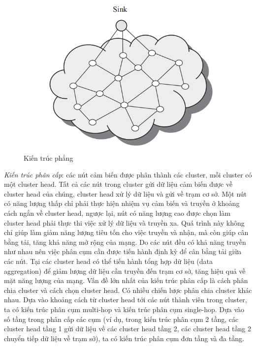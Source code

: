 \documentclass{article}
\begin{document}
\begin{figure}[ht]
\includegraphics[width=\textwidth]{images/Flat.PNG}
\caption{Kiến trúc phẳng \cite{architecture}}
\end{figure}
\newline \emph{Kiến trúc phân cấp}: các nút cảm biến được phân thành các cluster, mỗi cluster có một cluster head. Tất cả các nút trong cluster gửi dữ liệu cảm biến được về cluster head của chúng, cluster head xử lý dữ liệu và gửi về trạm cơ sở. Một nút có năng lượng thấp chỉ phải thực hiện nhiệm vụ cảm biến và truyền ở khoảng cách ngắn về cluster head, ngược lại, nút có năng lượng cao được chọn làm cluster head phải thực thi việc xử lý dữ liệu và truyền xa. Quá trình này không chỉ giúp làm giảm năng lượng tiêu tốn cho việc truyền và nhận, mà còn giúp cân bằng tải, tăng khả năng mở rộng của mạng. Do các nút đều có khả năng truyền như nhau nên việc phân cụm cần được tiến hành định kỳ để cân bằng tải giữa các nút. Tại các cluster head có thể tiến hành tổng hợp dữ liệu (data aggregation) để giảm lượng dữ liệu cần truyền đến trạm cơ sở, tăng hiệu quả về mặt năng lượng của mạng.
\newline Vấn đề lớn nhất của kiến trúc phân cấp là cách phân chia cluster và cách chọn cluster head. Có nhiều chiến lược phân chia cluster khác nhau. Dựa vào khoảng cách từ cluster head tới các nút thành viên trong cluster, ta có kiến trúc phân cụm multi-hop và kiến trúc phân cụm single-hop. Dựa vào số tầng trong phân cấp các cụm (ví dụ, trong kiến trúc phân cụm 2 tầng, các cluster head tầng 1 gửi dữ liệu về các cluster head tầng 2, các cluster head tầng 2 chuyển tiếp dữ liệu về trạm sở), ta có kiến trúc phân cụm đơn tầng và đa tầng. 
\end{document}
